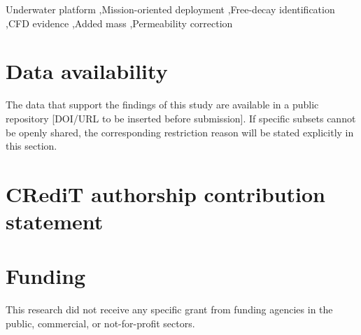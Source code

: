 \documentclass[final,5p,times,twocolumn]{elsarticle}
\begin{document}
\begin{frontmatter}
\begin{graphicalabstract}
\end{graphicalabstract}

\begin{highlights}
  
\end{highlights}

\begin{keyword}
  Underwater platform \sep Mission-oriented deployment \sep Free-decay identification \sep CFD evidence \sep Added mass \sep Permeability correction
\end{keyword}

\end{frontmatter}


% 










\section*{Data availability}
The data that support the findings of this study are available in a public
repository [DOI/URL to be inserted before submission]. If specific subsets
cannot be openly shared, the corresponding restriction reason will be stated
explicitly in this section.

\section*{CRediT authorship contribution statement}

\section*{Funding}
This research did not receive any specific grant from funding agencies in the
public, commercial, or not-for-profit sectors.
\end{document}
